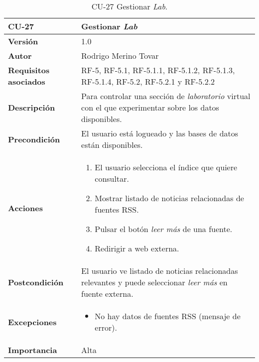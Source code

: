 \begin{table}[p]
	\centering
	\begin{tabularx}{\linewidth}{ p{} p{} }
		\toprule
		\textbf{CU-27}    & \textbf{Gestionar \emph{Lab}}\\
		\toprule
		\textbf{Versión}              & 1.0    \\
		\textbf{Autor}                & Rodrigo Merino Tovar \\
		\textbf{Requisitos asociados} & RF-5, RF-5.1, RF-5.1.1, RF-5.1.2, RF-5.1.3, RF-5.1.4, RF-5.2, RF-5.2.1 y RF-5.2.2 \\
		\textbf{Descripción}          & Para controlar una sección de \emph{laboratorio} virtual con el que experimentar sobre los datos disponibles.\\
		\textbf{Precondición}         & El usuario está logueado y las bases de datos están disponibles.  \\
		\textbf{Acciones}             &
		\begin{enumerate}
			\def\labelenumi{\arabic{enumi}.}
			\tightlist 
			\item El usuario selecciona el índice que quiere consultar. 
			\item Mostrar listado de noticias relacionadas de fuentes RSS.
			\item Pulsar el botón \emph{leer más} de una fuente.
			\item Redirigir a web externa. 
		\end{enumerate}\\
		\textbf{Postcondición}        & El usuario ve listado de noticias relacionadas relevantes y puede seleccionar \emph{leer más} en fuente externa. \\
		\textbf{Excepciones}          & 
		\begin{itemize}
			\tightlist
			\item No hay datos de fuentes RSS (mensaje de error).
		\end{itemize} \\
		\textbf{Importancia}          & Alta \\
		\bottomrule
	\end{tabularx}
	\caption{CU-27 Gestionar \emph{Lab}.}
\end{table}